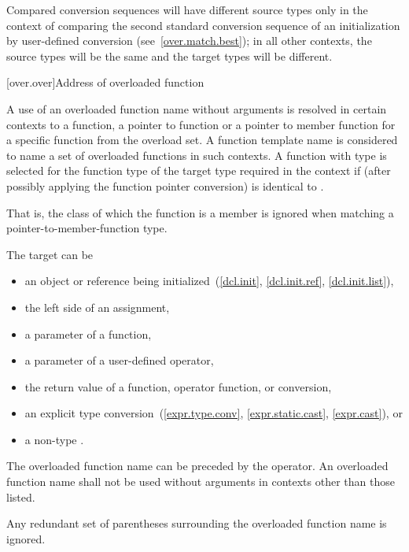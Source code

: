 \begin{itemize}
\begin{note}
Compared conversion sequences will have different source types only in the
context of comparing the second standard conversion sequence of an
initialization by user-defined conversion (see~\ref{over.match.best}); in
all other contexts, the source types will be the same and the target
types will be different.
\end{note}
\end{itemize}%
%

[over.over]{Address of overloaded function}%
%

\pnum
A use of an overloaded function name without arguments is resolved
in certain contexts to a function, a pointer to function or a pointer to
member function for a specific function from the overload set.
A function template name is considered to name a set of overloaded functions
in such contexts.
A function with type  is selected for the function type 
of the target type required in the context if 
(after possibly applying the function pointer conversion)
is identical to .
\begin{note}
That is, the class of which the function is a member is ignored when matching a
pointer-to-member-function type.
\end{note}
The target can be

\begin{itemize}
\item
an object or reference being initialized~(\ref{dcl.init}, \ref{dcl.init.ref},
\ref{dcl.init.list}),
\item
the left side of an assignment,
\item
a parameter of a function,
\item
a parameter of a user-defined operator,
\item
the return value of a function, operator function, or conversion,
\item
an explicit type conversion~(\ref{expr.type.conv}, \ref{expr.static.cast},
\ref{expr.cast}), or
\item
a non-type
.
\end{itemize}

The overloaded function name can be preceded by the
\tcode{\&}
operator.
An overloaded function name shall not be used without arguments in contexts
other than those listed.
\begin{note}
Any redundant set of parentheses surrounding the overloaded function name is
ignored.
\end{note}

